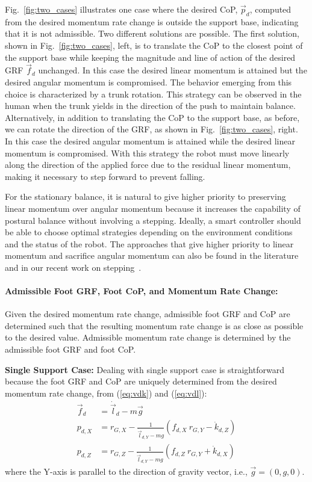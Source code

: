 \documentclass{llncs}
\newcommand{\vg}{\vec{g}}
\newcommand{\vp}{\vec{p}}
\newcommand{\vf}{\vec{f}}
\newcommand{\vdl} {\dot{\vec{l}}}
\begin{document}
Fig.~\ref{fig:two_cases} illustrates one case where the desired CoP, $\vp_d$,
computed from the desired momentum rate change is outside the support base,
indicating that it is not admissible.
Two different solutions are possible.
The first solution, shown in Fig.~\ref{fig:two_cases}, left, is to translate the CoP to the closest
point of the support base while keeping the magnitude and line of action of the
desired GRF $\vf_d$ unchanged. In this case the
desired linear momentum is attained but the desired
angular momentum is compromised. The behavior emerging from this choice
is characterized by a trunk rotation. This strategy can be observed in the
human when the trunk yields in the direction of the push to maintain balance.
Alternatively, in addition to
translating the CoP to the support base, as before, we can rotate
the direction of the GRF, as shown in Fig.~\ref{fig:two_cases}, right. In this case the desired
angular momentum is
attained while the desired linear momentum
 is compromised. With this strategy
 the robot must move linearly along the direction of the applied force
due to the residual linear momentum, making it necessary to step forward
to prevent falling.

For the stationary balance, it is natural to give higher priority to preserving linear momentum over angular
momentum because it increases the capability of postural balance without
involving a stepping.
Ideally, a smart controller should be able to choose
optimal strategies depending on the environment conditions
and the status of the robot.
The approaches that give higher priority to linear
momentum and sacrifice angular momentum can also be found
in the literature~\cite{Hofmann09,Stephens10} and in our recent work on stepping~\cite{YG11}.

\paragraph{Admissible Foot GRF, Foot CoP, and Momentum Rate Change:}
\label{sec:local_grf}

Given the desired momentum rate change, admissible foot GRF and CoP are determined such that the resulting momentum
rate change is as close as possible to the desired value.
Admissible momentum rate change is determined by
the admissible foot GRF and foot CoP.

{\bf Single Support Case:}
Dealing with single support case is straightforward
because the foot GRF and CoP are uniquely determined
from the desired momentum rate change, from (\ref{eq:vdk}) and (\ref{eq:vdl}):
\begin{align}
  \vf_d &= \vdl_d - m\vg \label{eq:vf_d}\\
	p_{d,X} &= r_{G,X} - \frac{1}{\vdl_{d,Y} - mg} ( f_{d,X}\: r_{G,Y} - \dot{k}_{d,Z} )\label{eq:pdx}\\
	p_{d,Z} &= r_{G,Z} - \frac{1}{\vdl_{d,Y} - mg} ( f_{d,Z}\: r_{G,Y} + \dot{k}_{d,X} ) \label{eq:pdz}
\end{align}
where the Y-axis is parallel to the direction of gravity vector, i.e., $\vg=(0,g,0)$.
\end{document}
